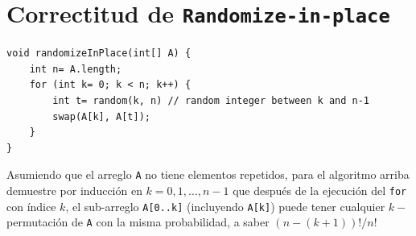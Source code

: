 \section{Correctitud de \texttt{Randomize-in-place}}

\begin{lstlisting}
void randomizeInPlace(int[] A) {
	int n= A.length;
	for (int k= 0; k < n; k++) {
		int t= random(k, n) // random integer between k and n-1
		swap(A[k], A[t]);
	}
}
\end{lstlisting}

Asumiendo que el arreglo \texttt{A} no tiene elementos repetidos, 
para el algoritmo arriba demuestre por inducción en $k= 0, 1, \ldots, n-1$
que después de la ejecución del \texttt{for} con índice $k$, el sub-arreglo
\texttt{A[0..k]} (incluyendo \texttt{A[k]}) puede tener cualquier
$k-$permutación de \texttt{A} con la misma probabilidad, a saber
\(
	(n-(k+1))!/n!
\)

